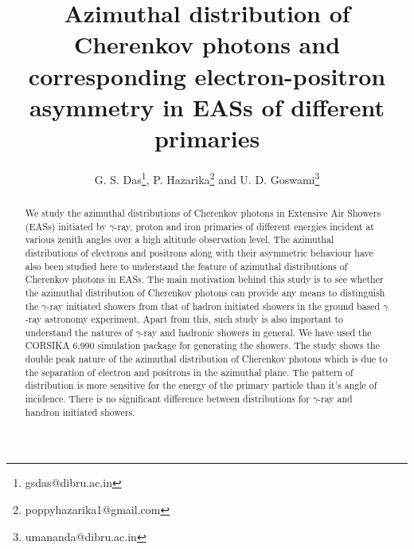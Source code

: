 \documentclass[amsmath,amssymb,showpacs,showkeywords]{revtex4}
\begin{document}
\title{Azimuthal distribution of Cherenkov photons and corresponding 
electron-positron asymmetry in EASs of different primaries}
\author{G. S. Das\footnote{gsdas@dibru.ac.in}, P. Hazarika\footnote{poppyhazarika1@gmail.com} and U. D. Goswami\footnote{umananda@dibru.ac.in}}

\begin{abstract}
We study the azimuthal distributions of Cherenkov photons in Extensive Air 
Showers (EASs) initiated by $\gamma$-ray, proton and iron primaries of 
different energies incident at various zenith angles over a high altitude
observation level. The azimuthal distributions of electrons and positrons along
with their asymmetric behaviour have also been studied here to understand the 
feature of azimuthal distributions of Cherenkov photons in EASs. The main 
motivation 
behind this study is to see whether the azimuthal distribution of Cherenkov 
photons can provide any means to distinguish the $\gamma$-ray initiated 
showers from that of hadron initiated showers in the ground based $\gamma$-ray 
astronomy experiment. Apart from this, such study is also important to 
understand the natures of $\gamma$-ray and hadronic showers in general. We have 
used the CORSIKA 6.990 simulation package for generating the showers. The 
study shows the double peak nature of the azimuthal distribution of Cherenkov
photons which is due to the separation of electron and positrons in the 
azimuthal plane. The pattern of distribution is more sensitive for the energy
of the primary particle than it's angle of incidence. There is no significant
difference between distributions for $\gamma$-ray and handron initiated 
showers.  
\end{abstract}

\maketitle
\end{document}
